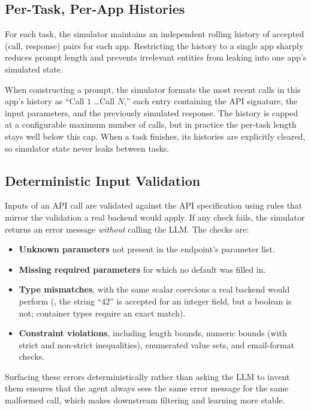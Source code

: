 \subsection{Per-Task, Per-App Histories}
\label{app:sim_history}
For each task, the simulator maintains an independent rolling history of accepted (call, response) pairs for each app. Restricting the history to a single app sharply reduces prompt length and prevents irrelevant entities from leaking into one app's simulated state.

When constructing a prompt, the simulator formats the most recent calls in this app's history as ``Call $1$ \dots Call $N$,'' each entry containing the API signature, the input parameters, and the previously simulated response. The history is capped at a
configurable maximum number of calls, but in practice the per-task length stays well below this cap. When a task finishes, its histories are explicitly cleared, so simulator state never leaks between tasks.


\subsection{Deterministic Input Validation}
\label{app:sim_validation}
Inputs of an API call are validated against the API specification using rules that mirror the validation a real backend would apply. If any check fails, the simulator returns an error message \emph{without} calling the LLM. The checks are:
\begin{itemize}[leftmargin=*,topsep=2pt,itemsep=2pt]
\item \textbf{Unknown parameters} not present in the endpoint's parameter list.
\item \textbf{Missing required parameters} for which no default was filled in.
\item \textbf{Type mismatches}, with the same scalar coercions a real backend would perform (\eg, the string ``42'' is accepted for an integer field, but a boolean is not; container types require an exact match).
\item \textbf{Constraint violations}, including length bounds, numeric bounds (with strict and non-strict inequalities), enumerated value sets, and email-format checks.
\end{itemize}
Surfacing these errors deterministically rather than asking the LLM to invent them ensures that the agent always sees the same error message for the same malformed call, which makes downstream filtering and learning more stable.

